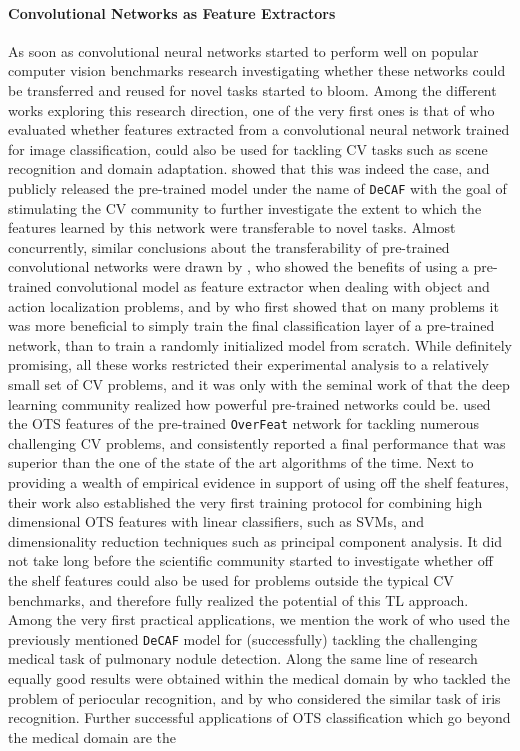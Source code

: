 \paragraph{Convolutional Networks as Feature Extractors}
As soon as convolutional neural networks started to perform well on popular computer vision benchmarks research investigating whether these networks could be transferred and reused for novel tasks started to bloom. Among the different works exploring this research direction, one of the very first ones is that of \citet{donahue2014decaf} who evaluated whether features extracted from a convolutional neural network trained for image classification, could also be used for tackling CV tasks such as scene recognition and domain adaptation. \citet{donahue2014decaf} showed that this was indeed the case, and publicly released the pre-trained model under the name of \texttt{DeCAF} with the goal of stimulating the CV community to further investigate the extent to which the features learned by this network were transferable to novel tasks. Almost concurrently, similar conclusions about the transferability of pre-trained convolutional networks were drawn by \citet{oquab2014learning}, who showed the benefits of using a pre-trained convolutional model as feature extractor when dealing with object and action localization problems, and by \citet{zeiler2014visualizing} who first showed that on many problems it was more beneficial to simply train the final classification layer of a pre-trained network, than to train a randomly initialized model from scratch. While definitely promising, all these works restricted their experimental analysis to a relatively small set of CV problems, and it was only with the seminal work of \citet{sharif2014cnn} that the deep learning community realized how powerful pre-trained networks could be. \citet{sharif2014cnn} used the OTS features of the pre-trained \texttt{OverFeat} network \cite{sermanet2013overfeat} for tackling numerous challenging CV problems, and consistently reported a final performance that was superior than the one of the state of the art algorithms of the time. Next to providing a wealth of empirical evidence in support of using off the shelf features, their work also established the very first training protocol for combining high dimensional OTS features with linear classifiers, such as SVMs, and dimensionality reduction techniques such as principal component analysis. It did not take long before the scientific community started to investigate whether off the shelf features could also be used for problems outside the typical CV benchmarks, and therefore fully realized the potential of this TL approach. Among the very first practical applications, we mention the work of \citet{van2015off} who used the previously mentioned \texttt{DeCAF} model for (successfully) tackling the challenging medical task of pulmonary nodule detection. Along the same line of research equally good results were obtained within the medical domain by \citet{hernandez2018periocular} who tackled the problem of periocular recognition, and by \citet{nguyen2017iris} who considered the similar task of iris recognition. Further successful applications of OTS classification which go beyond the medical domain are the 